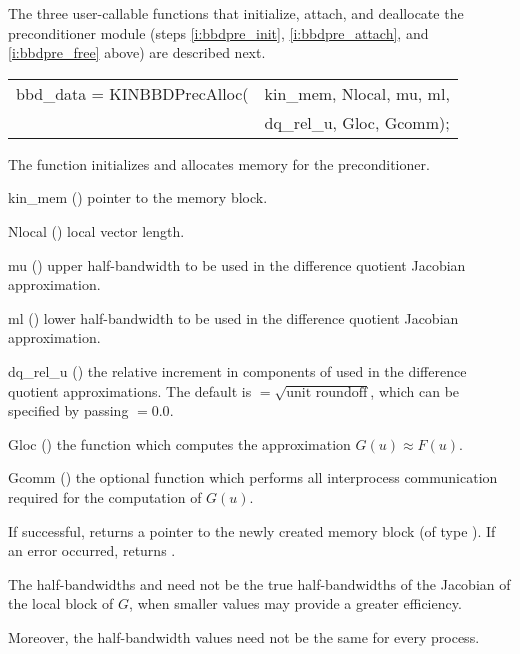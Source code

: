 The three user-callable functions that initialize, attach, and deallocate
the {\kinbbdpre} preconditioner module (steps \ref{i:bbdpre_init},
\ref{i:bbdpre_attach}, and \ref{i:bbdpre_free} above) are described
next.
{
   \begin{tabular}[t]{@{}r@{}l@{}}
     bbd\_data = KINBBDPrecAlloc(&kin\_mem, Nlocal, mu, ml, \\
                                 &dq\_rel\_u, Gloc, Gcomm);
   \end{tabular}
}
{
  The function  initializes and allocates
  memory for the {\kinbbdpre} preconditioner.
}
{
  \begin{args}[dq\_rel\_u]
  \item[kin\_mem] ()
    pointer to the {\kinsol} memory block.
  \item[Nlocal] ()
    local vector length.
  \item[mu] ()
    upper half-bandwidth to be used in the difference quotient Jacobian approximation.
  \item[ml] ()
    lower half-bandwidth to be used in the difference quotient Jacobian approximation.
  \item[dq\_rel\_u] ()
    the relative increment in components of  used in the difference quotient
    approximations.  The default is $ = \sqrt{\text{unit roundoff}}$,
    which can be specified by passing $ = 0.0$.
  \item[Gloc] ()
    the {\C} function which computes the approximation $G(u) \approx F(u)$. 
  \item[Gcomm] ()
    the optional {\C} function which performs all interprocess communication required for
    the computation of $G(u)$.
  \end{args}
}
{
  If successful,  returns a pointer to the newly created 
  {\kinbbdpre} memory block (of type ).
  If an error occurred,  returns .
}
{
  The half-bandwidths  and  need not be the true 
  half-bandwidths of the Jacobian of the local block of $G$,    
  when smaller values may provide a greater efficiency.       

  Moreover, the half-bandwidth values need not be the same for every process.
}
